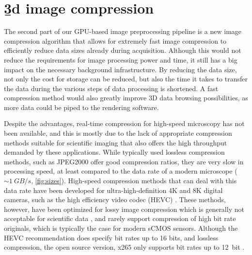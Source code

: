   
\section{\b3d image compression}

  The second part of our GPU-based image preprocessing pipeline is a new image compression algorithm that allows for extremely fast image compression to efficiently reduce data sizes already during acquisition.
  Although this would not reduce the requirements for image processing power and time, it still has a big impact on the necessary background infrastructure. By reducing the data size, not only the cost for storage can be reduced, but also the time it takes to transfer the data during the various steps of data processing is shortened. A fast compression method would also greatly improve 3D data browsing possibilities, as more data could be piped to the rendering software.

  Despite the advantages, real-time compression for high-speed microscopy has not been available, and this is mostly due to the lack of appropriate compression methods suitable for scientific imaging that also offers the high throughput demanded by these applications. While typically used lossless compression methods, such as JPEG2000 \cite{adams_jpeg-2000_2001} offer good compression ratios, they are very slow in processing speed, at least compared to the data rate of a modern microscope ($\sim \SI{1}{GB/s}$, \autoref{fig:sizes}). High-speed compression methods that can deal with this data rate have been developed for ultra-high-definition 4K and 8K digital cameras, such as the high efficiency video codec (HEVC) \cite{international_telecommunications_union_h.265_2016}. These methods, however, have been optimized for lossy image compression which is generally not acceptable for scientific data \cite{cromey_digital_2013}, and rarely support compression of high bit rate originals, which is typically the case for modern sCMOS sensors. Although the HEVC recommendation does specify bit rates up to 16 bits, and lossless compression, the open source version, x265 only supports bit rates up to \SI{12}{bit} \cite{noauthor_x265_nodate}.

